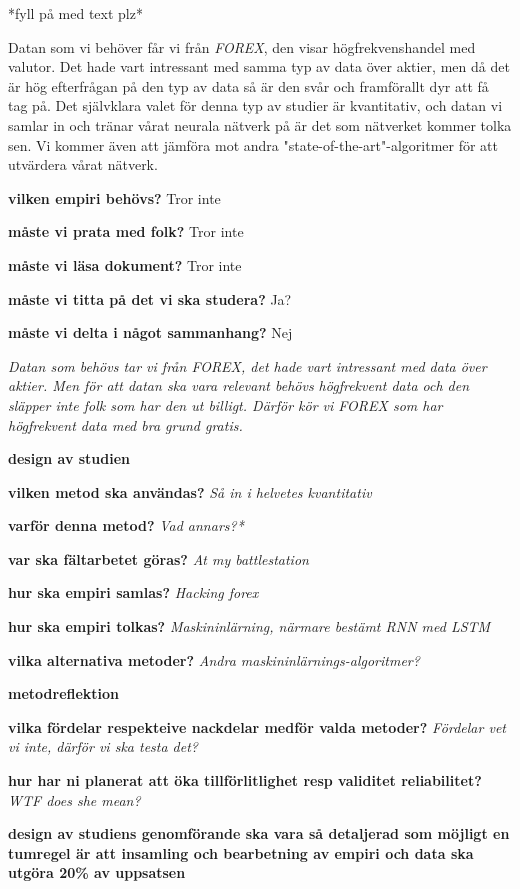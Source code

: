 *fyll på med text plz*

Datan som vi behöver får vi från \textit{FOREX}, den visar högfrekvenshandel med valutor. Det hade vart intressant med samma typ av data över aktier, men då det är hög efterfrågan på den typ av data så är den svår och framförallt dyr att få tag på.
Det självklara valet för denna typ av studier är kvantitativ, och datan vi samlar in och tränar vårat neurala nätverk på är det som nätverket kommer tolka sen. Vi kommer även att jämföra mot andra "state-of-the-art"-algoritmer för att utvärdera vårat nätverk.

\textbf{vilken empiri behövs?} Tror inte

\textbf{måste vi prata med folk?} Tror inte

\textbf{måste vi läsa dokument?} Tror inte

\textbf{måste vi titta på det vi ska studera?} Ja?

\textbf{måste vi delta i något sammanhang?} Nej

\textit{Datan som behövs tar vi från FOREX, det hade vart intressant med data över aktier. Men för att datan ska vara relevant behövs högfrekvent data och den släpper inte folk som har den ut billigt. Därför kör vi FOREX som har högfrekvent data med bra grund gratis.}

\textbf{design av studien}

\textbf{vilken metod ska användas?}
\textit{Så in i helvetes kvantitativ}

\textbf{varför denna metod?}
\textit{Vad annars?*}

\textbf{var ska fältarbetet göras?}
\textit{At my battlestation}

\textbf{hur ska empiri samlas?}
\textit{Hacking forex}

\textbf{hur ska empiri tolkas?}
\textit{Maskininlärning, närmare bestämt RNN med LSTM}

\textbf{vilka alternativa metoder?}
\textit{Andra maskininlärnings-algoritmer?}

\textbf{metodreflektion}

\textbf{vilka fördelar respekteive nackdelar medför valda metoder?}
\textit{Fördelar vet vi inte, därför vi ska testa det?}

\textbf{hur har ni planerat att öka tillförlitlighet resp validitet reliabilitet?}
\textit{WTF does she mean?}

\textbf{design av studiens genomförande ska vara så detaljerad som möjligt en tumregel är att insamling och bearbetning av empiri och data ska utgöra 20\% av uppsatsen}
